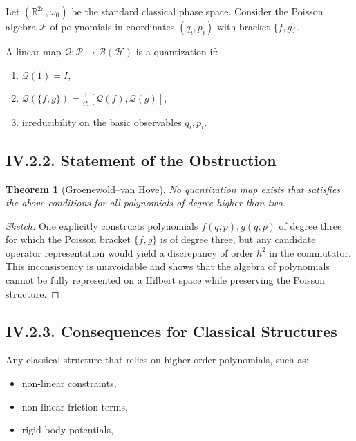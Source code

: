 \documentclass[12pt,oneside]{book}
\theoremstyle{plain}
\newtheorem{theorem}{Theorem}[chapter]
\theoremstyle{definition}
\begin{document}
Let $(\mathbb{R}^{2n},\omega_0)$ be the standard classical phase space. Consider the Poisson algebra $\mathcal{P}$ of polynomials in coordinates $(q_i,p_i)$ with bracket $\{f,g\}$. 

A linear map $\mathcal{Q}:\mathcal{P} \to \mathcal{B}(\mathcal{H})$ is a quantization if:

\begin{enumerate}
    \item $\mathcal{Q}(1)=I$,
    \item $\mathcal{Q}(\{f,g\}) = \frac{1}{i\hbar}[\mathcal{Q}(f),\mathcal{Q}(g)]$,
    \item irreducibility on the basic observables $q_i,p_i$.
\end{enumerate}

\subsection*{IV.2.2. Statement of the Obstruction}

\begin{theorem}[Groenewold–van Hove]
No quantization map exists that satisfies the above conditions for all polynomials of degree higher than two.
\end{theorem}

\begin{proof}[Sketch]
One explicitly constructs polynomials $f(q,p),g(q,p)$ of degree three for which the Poisson bracket $\{f,g\}$ is of degree three, but any candidate operator representation would yield a discrepancy of order $\hbar^2$ in the commutator. This inconsistency is unavoidable and shows that the algebra of polynomials cannot be fully represented on a Hilbert space while preserving the Poisson structure.
\end{proof}

\subsection*{IV.2.3. Consequences for Classical Structures}

Any classical structure that relies on higher-order polynomials, such as:

\begin{itemize}
    \item non-linear constraints,
    \item non-linear friction terms,
    \item rigid-body potentials,
\end{itemize}
\end{document}
